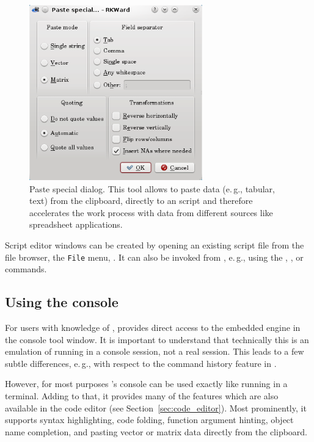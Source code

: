 \begin{figure}[t!]
 \centering
 \includegraphics[width=7.5cm]{./figures/special_paste.png}
 \caption{Paste special dialog. This tool allows to paste data (e.\,g., tabular, text) from the clipboard, directly to an 
  script and therefore accelerates the work process with data from different sources 
 like spreadsheet applications.
}
 \label{fig:special_paste}
\end{figure}

Script editor windows can be created by opening an existing
 script file from the file browser, the
\texttt{File} menu, . It can
also be invoked from , e.\,g., using the
, , or 
commands.

\subsection[Using the R console]{Using the  console}
\label{sec:using_R_console}
For users with knowledge of ,  provides direct access to the
embedded  engine in the
 console tool window. It is important to understand that technically this is an
emulation of  running in a console
session, not a real  session. This leads to a few subtle
differences, e.\,g., with respect to the command history feature in
.

However, for most purposes 's  console can be used exactly
like  running in a terminal. Adding to that, it provides many of the
features which are also available in the code editor (see Section~\ref{sec:code_editor}).
Most prominently, it supports syntax highlighting, code
folding, function argument hinting, object name completion, and pasting
vector or matrix data directly from the clipboard.

